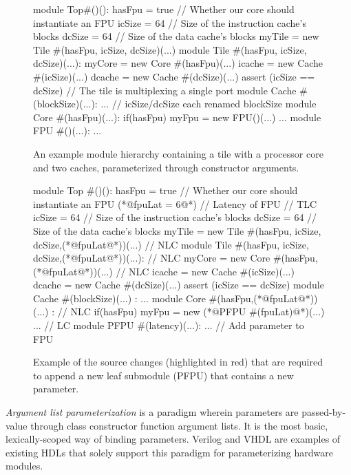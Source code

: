 \begin{figure}
\centering
\begin{phdl}
module Top#()():
  hasFpu = true  // Whether our core should instantiate an FPU
  icSize = 64    // Size of the instruction cache's blocks
  dcSize = 64    // Size of the data cache's blocks
  myTile = new Tile #(hasFpu, icSize, dcSize)(...)
module Tile #(hasFpu, icSize, dcSize)(...):
  myCore = new Core  #(hasFpu)(...)
  icache = new Cache #(icSize)(...)
  dcache = new Cache #(dcSize)(...)
  assert (icSize == dcSize)         // The tile is multiplexing a single port
module Cache #(blockSize)(...): ... // icSize/dcSize each renamed blockSize
module Core #(hasFpu)(...):
  if(hasFpu) myFpu = new FPU()(...) ...
module FPU #()(...): ...
\end{phdl} 
\caption{An example module hierarchy containing a tile with a processor core and two caches, parameterized through constructor arguments.}
\label{fig:arglist}
\end{figure}

\begin{figure}
\centering
\begin{phdl}
module Top #()():
  hasFpu = true  // Whether our core should instantiate an FPU
  (*@\textcolor[rgb]{1,0,0}{fpuLat = 6}@*)     // Latency of FPU                               // TLC
  icSize = 64    // Size of the instruction cache's blocks
  dcSize = 64    // Size of the data cache's blocks
  myTile = new Tile #(hasFpu, icSize, dcSize,(*@\textcolor[rgb]{1,0,0}{fpuLat}@*))(...)        // NLC
module Tile #(hasFpu, icSize, dcSize,(*@\textcolor[rgb]{1,0,0}{fpuLat}@*))(...):               // NLC
  myCore = new Core  #(hasFpu, (*@\textcolor[rgb]{1,0,0}{fpuLat}@*))(...)                      // NLC
  icache = new Cache #(icSize)(...)
  dcache = new Cache #(dcSize)(...)
  assert (icSize == dcSize) 
module Cache #(blockSize)(...) : ... 
module Core #(hasFpu,(*@\textcolor[rgb]{1,0,0}{fpuLat}@*))(...) :                              // NLC
  if(hasFpu) myFpu = new (*@\textcolor[rgb]{1,0,0}{PFPU \#(fpuLat)}@*)(...) ...                 // LC
module PFPU #(latency)(...): ...     // Add parameter to FPU 
\end{phdl}
\caption{Example of the source changes (highlighted in red) that are required to append a new leaf submodule (PFPU) that contains a new parameter.}
\label{fig:arglist-delta}
\end{figure}

\emph{Argument list parameterization} is a paradigm wherein parameters are passed-by-value through class constructor function argument lists. 
It is the most basic, lexically-scoped way of binding parameters.
Verilog and VHDL are examples of existing HDLs that solely support this paradigm for parameterizing hardware modules.
 
